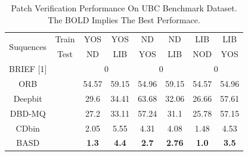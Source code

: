 \documentclass[letterpaper, 10 pt, conference]{ieeeconf}  %
\begin{document}
\begin{table}[h]
\centering
\scriptsize
\caption{Patch Verification Performance On UBC Benchmark Dataset. The BOLD Implies The Best Performace.}
\label{table_example}
\begin{center}
\begin{tabular}{cccccccc}
\toprule
\midrule
\multirow{2}{*}{Suquences} & \multicolumn{1}{c}{Train} & \multicolumn{1}{c}{YOS} & \multicolumn{1}{c}{YOS}  & \multicolumn{1}{c}{ND}  & \multicolumn{1}{c}{ND}  & \multicolumn{1}{c}{LIB}   & \multicolumn{1}{c}{LIB}  \\
  \cline{3-8}
                           & \multicolumn{1}{c}{Test} & \multicolumn{1}{c}{ND} & \multicolumn{1}{c}{LIB}  & \multicolumn{1}{c}{YOS}  & \multicolumn{1}{c}{LIB}  & \multicolumn{1}{c}{NOD}   & \multicolumn{1}{c}{YOS}  \\
  \cline{3-8}


\multirow{1}{*}{BRIEF [1]}     & \multicolumn{1}{c}{ }                                         & \multicolumn{2}{c}{0}                                                 & \multicolumn{2}{c}{0}                                         & \multicolumn{2}{c}{0}  \\
  \cline{3-8}
\multirow{1}{*}{ORB}   & \multicolumn{1}{c}{} & \multicolumn{1}{c}{54.57} & \multicolumn{1}{c}{59.15} & \multicolumn{1}{c}{54.96}  & \multicolumn{1}{c}{59.15}  & \multicolumn{1}{c}{54.57}  & \multicolumn{1}{c}{54.96}  \\
  \cline{3-8}
\multirow{1}{*}{Deepbit} & \multicolumn{1}{c}{}  & \multicolumn{1}{c}{29.6} & \multicolumn{1}{c}{34.41} & \multicolumn{1}{c}{63.68}  & \multicolumn{1}{c}{32.06}  & \multicolumn{1}{c}{26.66}  & \multicolumn{1}{c}{57.61}  \\
  \cline{3-8}
\multirow{1}{*}{DBD-MQ}   & \multicolumn{1}{c}{}  & \multicolumn{1}{c}{27.2} & \multicolumn{1}{c}{33.11} & \multicolumn{1}{c}{57.24}  & \multicolumn{1}{c}{31.1}  & \multicolumn{1}{c}{25.78}  & \multicolumn{1}{c}{57.15}  \\
  \cline{3-8}
\multirow{1}{*}{CDbin}   & \multicolumn{1}{c}{}  & \multicolumn{1}{c}{2.05} & \multicolumn{1}{c}{5.55} & \multicolumn{1}{c}{4.31}  & \multicolumn{1}{c}{4.08}  & \multicolumn{1}{c}{1.48}  & \multicolumn{1}{c}{4.53}  \\
  \cline{3-8}
\multirow{1}{*}{BASD}  & \multicolumn{1}{c}{}  & \multicolumn{1}{c}{\textbf{1.3}} & \multicolumn{1}{c}{\textbf{4.4}} & \multicolumn{1}{c}{\textbf{2.7}}  & \multicolumn{1}{c}{\textbf{2.76}}  & \multicolumn{1}{c}{\textbf{1.0}}  & \multicolumn{1}{c}{\textbf{3.5}}  \\
\midrule
\toprule
\end{tabular} 
\end{center}
\end{table}
\vspace{-0.47cm}
\end{document}
